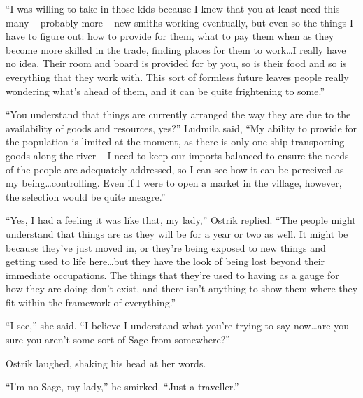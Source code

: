  

“I was willing to take in those kids because I knew that you at least need this many – probably more – new smiths working eventually, but even so the things I have to figure out: how to provide for them, what to pay them when as they become more skilled in the trade, finding places for them to work…I really have no idea. Their room and board is provided for by you, so is their food and so is everything that they work with. This sort of formless future leaves people really wondering what’s ahead of them, and it can be quite frightening to some.”

 

“You understand that things are currently arranged the way they are due to the availability of goods and resources, yes?” Ludmila said, “My ability to provide for the population is limited at the moment, as there is only one ship transporting goods along the river – I need to keep our imports balanced to ensure the needs of the people are adequately addressed, so I can see how it can be perceived as my being…controlling. Even if I were to open a market in the village, however, the selection would be quite meagre.”

 

“Yes, I had a feeling it was like that, my lady,” Ostrik replied. “The people might understand that things are as they will be for a year or two as well. It might be because they’ve just moved in, or they’re being exposed to new things and getting used to life here…but they have the look of being lost beyond their immediate occupations. The things that they’re used to having as a gauge for how they are doing don’t exist, and there isn’t anything to show them where they fit within the framework of everything.”

 

“I see,” she said. “I believe I understand what you’re trying to say now…are you sure you aren’t some sort of Sage from somewhere?”

 

Ostrik laughed, shaking his head at her words.

 

“I’m no Sage, my lady,” he smirked. “Just a traveller.”